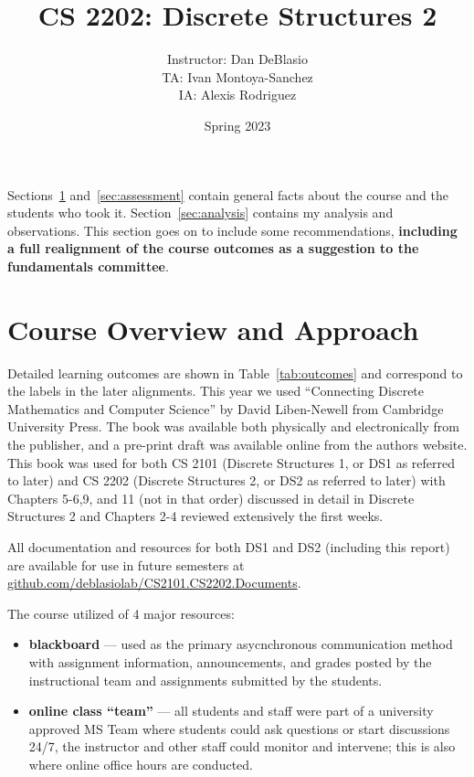 \documentclass[11pt]{article}
\begin{document}
\title{CS 2202: Discrete Structures 2}
\author{Instructor: Dan DeBlasio\\TA: Ivan Montoya-Sanchez\\IA: Alexis Rodriguez}
\date{Spring 2023}
\maketitle

Sections~\ref{sec:overview} and~\ref{sec:assessment} contain general facts about the course and the students who took it. 
Section~\ref{sec:analysis} contains my analysis and observations. This section goes on to include some recommendations, 
\textbf{\color{red}including a full realignment of the course outcomes as a suggestion to the fundamentals committee}. 

\section{Course Overview and Approach}
\label{sec:overview}
Detailed learning outcomes are shown in Table~\ref{tab:outcomes} and correspond to the labels in the later alignments. 
This year we used ``Connecting Discrete Mathematics and Computer Science'' by David Liben-Newell from Cambridge University Press.
The book was available both physically and electronically from the publisher, and a pre-print draft was available online from the authors website. 
This book was used for both CS 2101 (Discrete Structures 1, or DS1 as referred to later) and CS 2202  (Discrete Structures 2, or DS2 as referred to later) with Chapters 5-6,9, and 11 (not in that order) discussed in detail in Discrete Structures 2
and Chapters 2-4 reviewed extensively the first weeks. 

All documentation and resources for both DS1 and DS2 (including this report) are available for use in future semesters at \href{https://github.com/deblasiolab/CS2101.CS2202.Documents}{github.com/deblasiolab/CS2101.CS2202.Documents}.

The course utilized of 4 major resources:
\begin{itemize}

\item \textbf{blackboard} --- used as the primary asycnchronous communication method with assignment information, announcements, and grades posted by the instructional team and assignments submitted by the students. 
\item \textbf{online class ``team''} --- all students and staff were part of a university approved MS Team where students could ask questions or start discussions 24/7, 
the instructor and other staff could monitor and intervene; this is also where online office hours are conducted. 
\end{itemize}
\end{document}
